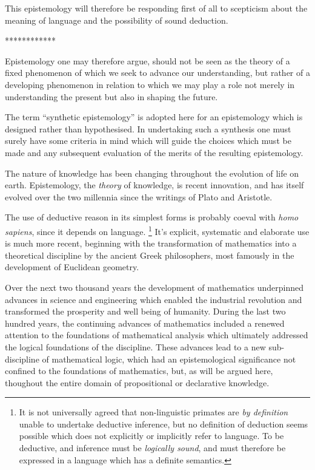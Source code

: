 \documentclass[10pt,titlepage]{book}
\begin{document}
This epistemology will therefore be responding first of all to scepticism about the meaning of language and the possibility of sound deduction.

************


Epistemology one may therefore argue, should not be seen as the theory of a fixed phenomenon of which we seek to advance our understanding, but rather of a developing phenomenon in relation to which we may play a role not merely in understanding the present but also in shaping the future.

The term ``synthetic epistemology'' is adopted here for an epistemology which is designed rather than hypothesised.
In undertaking such a synthesis one must surely have some criteria in mind which will guide the choices which must be made and any subsequent evaluation of the merits of the resulting epistemology.

The nature of knowledge has been changing throughout the evolution of life on earth.
Epistemology, the \emph{theory} of knowledge, is recent innovation, and has itself evolved over the two millennia since the writings of Plato and Aristotle.

The use of deductive reason in its simplest forms is probably coeval with \emph{homo sapiens}, since it depends on language.%
\footnote{It is not universally agreed that non-linguistic primates are \emph{by definition} unable to undertake deductive inference, but no definition of deduction seems possible which does not explicitly or implicitly refer to language.  To be deductive, and inference must be \emph{logically sound}, and must therefore be expressed in a language which has a definite semantics.}
It's explicit, systematic and elaborate use is much more recent, beginning with the transformation of mathematics into a theoretical discipline by the ancient Greek philosophers, most famously in the development of Euclidean geometry.

Over the next two thousand years the development of mathematics underpinned advances in science and engineering which enabled the industrial revolution and transformed the prosperity and well being of humanity.
During the last two hundred years, the continuing advances of mathematics included a renewed attention to the foundations of mathematical analysis which ultimately addressed the logical foundations of the discipline.
These advances lead to a new sub-discipline of mathematical logic, which had an epistemological significance not confined to the foundations of mathematics, but, as will be argued here, thoughout the entire domain of propositional or declarative knowledge.
\end{document}
